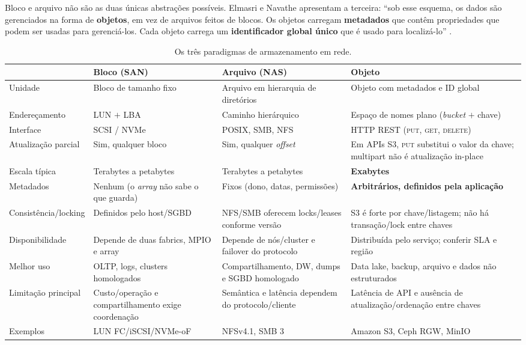 \documentclass[11pt,a4paper]{article}
\begin{document}
Bloco e arquivo não são as duas únicas abstrações possíveis. Elmasri e Navathe apresentam a
terceira: ``sob esse esquema, os dados são gerenciados na forma de \textbf{objetos}, em vez de
arquivos feitos de blocos. Os objetos carregam \textbf{metadados} que contêm propriedades que podem
ser usadas para gerenciá-los. Cada objeto carrega um \textbf{identificador global único} que é
usado para localizá-lo'' \cite{elmasri2018}.

\begin{table}[H]
\centering
\caption{Os três paradigmas de armazenamento em rede.}
\label{tab:paradigmas}
{\footnotesize
\begin{tabular}{@{}p{2.5cm}p{3.5cm}p{3.5cm}p{4.4cm}@{}}
\toprule
& \textbf{Bloco (SAN)} & \textbf{Arquivo (NAS)} & \textbf{Objeto} \\
\midrule
Unidade & Bloco de tamanho fixo & Arquivo em hierarquia de diretórios & Objeto com metadados e ID
global \\
Endereçamento & LUN $+$ LBA & Caminho hierárquico & Espaço de nomes plano (\textit{bucket} $+$
chave) \\
Interface & SCSI / NVMe & POSIX, SMB, NFS & HTTP REST (\textsc{put}, \textsc{get},
\textsc{delete}) \\
Atualização parcial & Sim, qualquer bloco & Sim, qualquer \textit{offset} & Em APIs S3,
\textsc{put} substitui o valor da chave; multipart não é atualização in-place \\
Escala típica & Terabytes a petabytes & Terabytes a petabytes & \textbf{Exabytes} \\
Metadados & Nenhum (o \textit{array} não sabe o que guarda) & Fixos (dono, datas, permissões) &
\textbf{Arbitrários, definidos pela aplicação} \\
Consistência/locking & Definidos pelo host/SGBD & NFS/SMB oferecem locks/leases conforme versão &
S3 é forte por chave/listagem; não há transação/lock entre chaves \cite{awss3consistency} \\
Disponibilidade & Depende de duas fabrics, MPIO e array & Depende de nós/cluster e failover do
protocolo & Distribuída pelo serviço; conferir SLA e região \\
Melhor uso & OLTP, logs, clusters homologados & Compartilhamento, DW, dumps e SGBD homologado &
Data lake, backup, arquivo e dados não estruturados \\
Limitação principal & Custo/operação e compartilhamento exige coordenação & Semântica e latência
dependem do protocolo/cliente & Latência de API e ausência de atualização/ordenação entre chaves \\
Exemplos & LUN FC/iSCSI/NVMe-oF & NFSv4.1, SMB 3 & Amazon S3, Ceph RGW, MinIO \\
\bottomrule
\end{tabular}}
\end{table}
\end{document}
